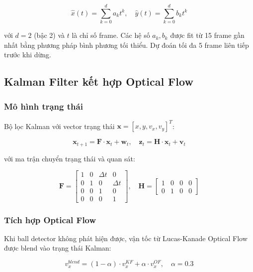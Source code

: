 \documentclass[12pt,a4paper]{article}
\begin{document}
\begin{equation}
\hat{x}(t) = \sum_{k=0}^{d} a_k t^k, \quad \hat{y}(t) = \sum_{k=0}^{d} b_k t^k
\label{eq:poly}
\end{equation}

với $d = 2$ (bậc 2) và $t$ là chỉ số frame. Các hệ số $a_k, b_k$ được fit từ 15 frame gần nhất bằng phương pháp bình phương tối thiểu. Dự đoán tối đa 5 frame liên tiếp trước khi dừng.

\subsection{Kalman Filter kết hợp Optical Flow}
\label{sec:kalman_of}

\subsubsection{Mô hình trạng thái}
Bộ lọc Kalman với vector trạng thái $\mathbf{x} = [x, y, v_x, v_y]^T$:

\begin{equation}
\mathbf{x}_{t+1} = \mathbf{F} \cdot \mathbf{x}_t + \mathbf{w}_t, \quad \mathbf{z}_t = \mathbf{H} \cdot \mathbf{x}_t + \mathbf{v}_t
\end{equation}

với ma trận chuyển trạng thái và quan sát:

\begin{equation}
\mathbf{F} = \begin{bmatrix} 1 & 0 & \Delta t & 0 \\ 0 & 1 & 0 & \Delta t \\ 0 & 0 & 1 & 0 \\ 0 & 0 & 0 & 1 \end{bmatrix}, \quad
\mathbf{H} = \begin{bmatrix} 1 & 0 & 0 & 0 \\ 0 & 1 & 0 & 0 \end{bmatrix}
\end{equation}

\subsubsection{Tích hợp Optical Flow}
Khi ball detector không phát hiện được, vận tốc từ Lucas-Kanade Optical Flow \cite{lucas1981} được blend vào trạng thái Kalman:

\begin{equation}
v_{x}^{blend} = (1 - \alpha) \cdot v_{x}^{KF} + \alpha \cdot v_{x}^{OF}, \quad \alpha = 0.3
\end{equation}
\end{document}
